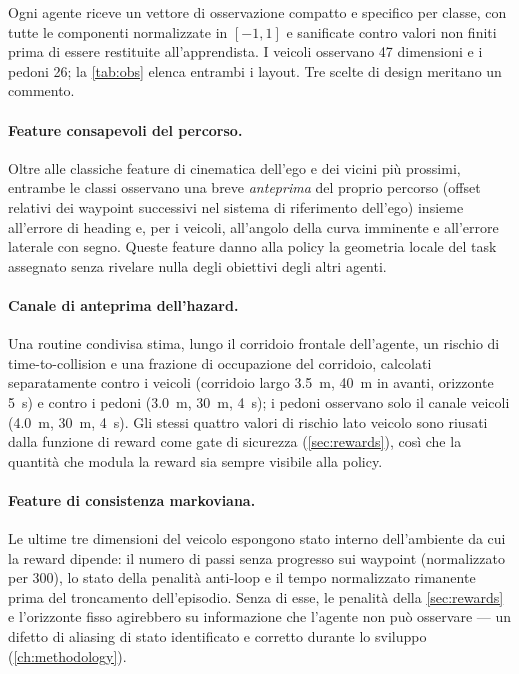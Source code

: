 Ogni agente riceve un vettore di osservazione compatto e specifico per
classe, con tutte le componenti normalizzate in $[-1, 1]$ e sanificate
contro valori non finiti prima di essere restituite all'apprendista. I
veicoli osservano 47 dimensioni e i pedoni 26; la \cref{tab:obs} elenca
entrambi i layout. Tre scelte di design meritano un commento.

\paragraph{Feature consapevoli del percorso.}
Oltre alle classiche feature di cinematica dell'ego e dei vicini più
prossimi, entrambe le classi osservano una breve \emph{anteprima} del
proprio percorso (offset relativi dei waypoint successivi nel sistema di
riferimento dell'ego) insieme all'errore di heading e, per i veicoli,
all'angolo della curva imminente e all'errore laterale con segno. Queste
feature danno alla policy la geometria locale del task assegnato senza
rivelare nulla degli obiettivi degli altri agenti.

\paragraph{Canale di anteprima dell'hazard.}
Una routine condivisa stima, lungo il corridoio frontale dell'agente, un
rischio di time-to-collision e una frazione di occupazione del
corridoio, calcolati separatamente contro i veicoli (corridoio largo
\SI{3.5}{m}, \SI{40}{m} in avanti, orizzonte \SI{5}{s}) e contro i
pedoni (\SI{3.0}{m}, \SI{30}{m}, \SI{4}{s}); i pedoni osservano solo il
canale veicoli (\SI{4.0}{m}, \SI{30}{m}, \SI{4}{s}). Gli stessi quattro
valori di rischio lato veicolo sono riusati dalla funzione di reward
come gate di sicurezza (\cref{sec:rewards}), così che la quantità che
modula la reward sia sempre visibile alla policy.

\paragraph{Feature di consistenza markoviana.}
Le ultime tre dimensioni del veicolo espongono stato interno
dell'ambiente da cui la reward dipende: il numero di passi senza
progresso sui waypoint (normalizzato per 300), lo stato della penalità
anti-loop e il tempo normalizzato rimanente prima del troncamento
dell'episodio. Senza di esse, le penalità della \cref{sec:rewards} e
l'orizzonte fisso agirebbero su informazione che l'agente non può
osservare --- un difetto di aliasing di stato identificato e corretto
durante lo sviluppo (\cref{ch:methodology}).

